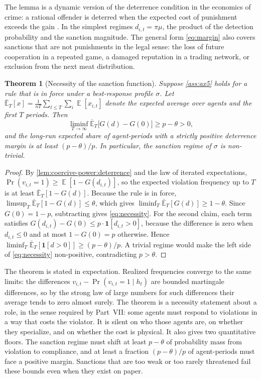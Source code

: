 \documentclass[11pt,letterpaper]{article}
\newtheorem{theorem}{Theorem}[section]
\theoremstyle{definition}
\theoremstyle{remark}
\newcommand{\E}{\operatorname{\mathbb{E}}}
\renewcommand{\Pr}{\operatorname{Pr}}
\begin{document}
The lemma is a dynamic version of the deterrence condition in the economics of crime: a rational offender is deterred when the expected cost of punishment exceeds the gain \citep{becker1968}. In the simplest regimes $d_{i,t} = \pi\mu$, the product of the detection probability and the sanction magnitude. The general form \eqref{eq:margin} also covers sanctions that are not punishments in the legal sense: the loss of future cooperation in a repeated game, a damaged reputation in a trading network, or exclusion from the next meat distribution.

\begin{theorem}[Necessity of the sanction function]
\label{thm:coercive-power:necessity}
Suppose \cref{ass:ax5} holds for a rule that is in force under a best-response profile $\sigma$. Let $\bar{\mathbb{E}}_T[x] = \frac{1}{nT}\sum_{t\le T}\sum_{i} \E[x_{i,t}]$ denote the expected average over agents and the first $T$ periods. Then
\begin{equation}
\liminf_{T\to\infty} \bar{\mathbb{E}}_T\bigl[G(d) - G(0)\bigr] \ge p - \theta > 0,
\label{eq:necessity}
\end{equation}
and the long-run expected share of agent-periods with a strictly positive deterrence margin is at least $(p - \theta)/p$. In particular, the sanction regime of $\sigma$ is non-trivial.
\end{theorem}

\begin{proof}
By \cref{lem:coercive-power:deterrence} and the law of iterated expectations, $\Pr(v_{i,t} = 1) \ge \E[1 - G(d_{i,t})]$, so the expected violation frequency up to $T$ is at least $\bar{\mathbb{E}}_T[1 - G(d)]$. Because the rule is in force, $\limsup_T \bar{\mathbb{E}}_T[1 - G(d)] \le \theta$, which gives $\liminf_T \bar{\mathbb{E}}_T[G(d)] \ge 1 - \theta$. Since $G(0) = 1 - p$, subtracting gives \eqref{eq:necessity}. For the second claim, each term satisfies $G(d_{i,t}) - G(0) \le p \cdot \mathbf{1}[d_{i,t} > 0]$, because the difference is zero when $d_{i,t} \le 0$ and at most $1 - G(0) = p$ otherwise. Hence $\liminf_T \bar{\mathbb{E}}_T[\mathbf{1}[d > 0]] \ge (p - \theta)/p$. A trivial regime would make the left side of \eqref{eq:necessity} non-positive, contradicting $p > \theta$.
\end{proof}

The theorem is stated in expectation. Realized frequencies converge to the same limits: the differences $v_{i,t} - \Pr(v_{i,t} = 1 \mid h_t)$ are bounded martingale differences, so by the strong law of large numbers for such differences their average tends to zero almost surely. The theorem is a necessity statement about a role, in the sense required by Part~VII: some agents must respond to violations in a way that costs the violator. It is silent on who those agents are, on whether they specialize, and on whether the cost is physical. It also gives two quantitative floors. The sanction regime must shift at least $p - \theta$ of probability mass from violation to compliance, and at least a fraction $(p-\theta)/p$ of agent-periods must face a positive margin. Sanctions that are too weak or too rarely threatened fail these bounds even when they exist on paper.
\end{document}
